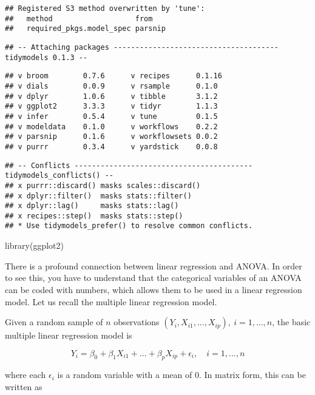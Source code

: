 \documentclass[
]{book}
\newenvironment{Shaded}{\begin{snugshade}}{\end{snugshade}}
\newcommand{\FunctionTok}[1]{\textcolor[rgb]{0.00,0.00,0.00}{#1}}
\newcommand{\NormalTok}[1]{#1}
\begin{document}
\begin{verbatim}
## Registered S3 method overwritten by 'tune':
##   method                   from   
##   required_pkgs.model_spec parsnip
\end{verbatim}

\begin{verbatim}
## -- Attaching packages -------------------------------------- tidymodels 0.1.3 --
\end{verbatim}

\begin{verbatim}
## v broom        0.7.6      v recipes      0.1.16
## v dials        0.0.9      v rsample      0.1.0 
## v dplyr        1.0.6      v tibble       3.1.2 
## v ggplot2      3.3.3      v tidyr        1.1.3 
## v infer        0.5.4      v tune         0.1.5 
## v modeldata    0.1.0      v workflows    0.2.2 
## v parsnip      0.1.6      v workflowsets 0.0.2 
## v purrr        0.3.4      v yardstick    0.0.8
\end{verbatim}

\begin{verbatim}
## -- Conflicts ----------------------------------------- tidymodels_conflicts() --
## x purrr::discard() masks scales::discard()
## x dplyr::filter()  masks stats::filter()
## x dplyr::lag()     masks stats::lag()
## x recipes::step()  masks stats::step()
## * Use tidymodels_prefer() to resolve common conflicts.
\end{verbatim}

\begin{Shaded}
\begin{Highlighting}[]
\FunctionTok{library}\NormalTok{(ggplot2)}
\end{Highlighting}
\end{Shaded}

There is a profound connection between linear regression and ANOVA. In
order to see this, you have to understand that the categorical variables
of an ANOVA can be coded with numbers, which allows them to be used in a
linear regression model. Let us recall \autocite{LinearMod} the multiple linear
regression model.

Given a random sample of \(n\) observations
\((Y_{i}, X_{i1}, . . ., X_{ip}),\ i=1,...,n\), the basic multiple linear regression model is

\[
Y_{i}=\beta_0+\beta_1X_{i1}+...+\beta_pX_{ip}+\epsilon_i,\quad i=1,...,n
\]

where each \(\epsilon_i\) is a random variable with a mean of \(0\). In
matrix form, this can be written as
\end{document}
